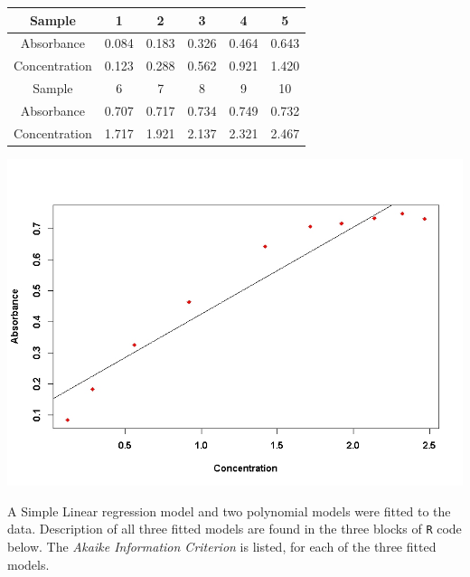\documentclass[a4paper,12pt]{article}
\begin{document}
\begin{center}
	\begin{tabular}{|c||c|c|c|c|c|}
		\hline
		Sample & 1 & 2 & 3 & 4 & 5 \\ \hline
		Absorbance & 0.084& 0.183& 0.326& 0.464& 0.643\\
		Concentration & 0.123& 0.288& 0.562& 0.921& 1.420\\ \hline
		Sample & 6 & 7 & 8 & 9 & 10 \\ \hline
		Absorbance & 0.707& 0.717& 0.734 &0.749 &0.732\\
		Concentration & 1.717& 1.921& 2.137 &2.321&2.467\\
		\hline
	\end{tabular}
\end{center}

\begin{center}
	\includegraphics[scale=0.55]{images/ExamQ3plot}
\end{center}

\noindent A Simple Linear regression model and two polynomial models were fitted to the data. Description of all three fitted models are found in the three blocks of \texttt{R} code below. The \emph{Akaike Information Criterion} is listed, for each of the three fitted models.
\end{document}
